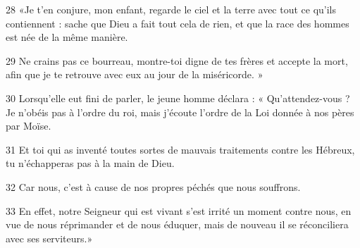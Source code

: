 
28 «Je t’en conjure, mon enfant, regarde le ciel et la terre avec tout ce qu’ils contiennent : sache que Dieu a fait tout cela de rien, et que la race des hommes est née de la même manière.

29 Ne crains pas ce bourreau, montre-toi digne de tes frères et accepte la mort, afin que je te retrouve avec eux au jour de la miséricorde. »

30 Lorsqu’elle eut fini de parler, le jeune homme déclara : « Qu’attendez-vous ? Je n’obéis pas à l’ordre du roi, mais j’écoute l’ordre de la Loi donnée à nos pères par Moïse.

31 Et toi qui as inventé toutes sortes de mauvais traitements contre les Hébreux, tu n’échapperas pas à la main de Dieu.

32 Car nous, c’est à cause de nos propres péchés que nous souffrons.

33 En effet, notre Seigneur qui est vivant s’est irrité un moment contre nous, en vue de nous réprimander et de nous éduquer, mais de nouveau il se réconciliera avec ses serviteurs.»
